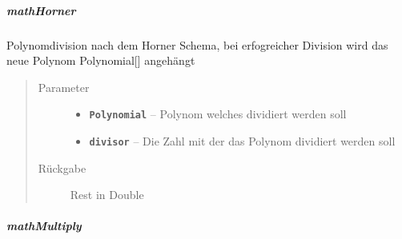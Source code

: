 \documentclass[letterpaper,10pt,ngerman]{sphinxmanual}
\begin{document}
\subparagraph{mathHorner}
\label{com/linuxluigi/polynomial/PolynomialList:mathhorner}

\begin{fulllineitems}
\label{com/linuxluigi/polynomial/PolynomialList:com.linuxluigi.polynomial.PolynomialList.mathHorner(Polynomial, double)}
Polynomdivision nach dem Horner Schema, bei erfogreicher Division wird das neue Polynom Polynomial{[}{]} angehängt
\begin{quote}\begin{description}
\item[{Parameter}] \leavevmode\begin{itemize}
\item {} 
\textbf{\texttt{Polynomial}} -- Polynom welches dividiert werden soll

\item {} 
\textbf{\texttt{divisor}} -- Die Zahl mit der das Polynom dividiert werden soll

\end{itemize}

\item[{Rückgabe}] \leavevmode
Rest in Double

\end{description}\end{quote}

\end{fulllineitems}



\subparagraph{mathMultiply}
\label{com/linuxluigi/polynomial/PolynomialList:mathmultiply}
\end{document}
